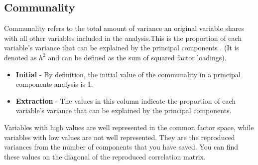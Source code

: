 \documentclass[a4paper,12pt]{article}
\begin{document}
\subsection{Communality} 
Communality refers to the total amount of variance an original variable shares with all other
variables included in the analysis.This is the proportion of each variable's variance that can be explained by the principal components .  (It is denoted as $h^2$ and can be defined as the sum of squared factor loadings).

\begin{itemize}
	\item \textbf{Initial} - By definition, the initial value of the communality in a principal components analysis is 1.
	
	\item \textbf{Extraction}  - The values in this column indicate the proportion of each variable's variance that can be explained by the principal components. 
\end{itemize}
 Variables with high values are well represented in the common factor space, while variables with low values are not well represented. They are the reproduced variances from the number of components that you have saved.  You can find these values on the diagonal of the reproduced correlation matrix.



%
%
%
%
%
%
\end{document}
